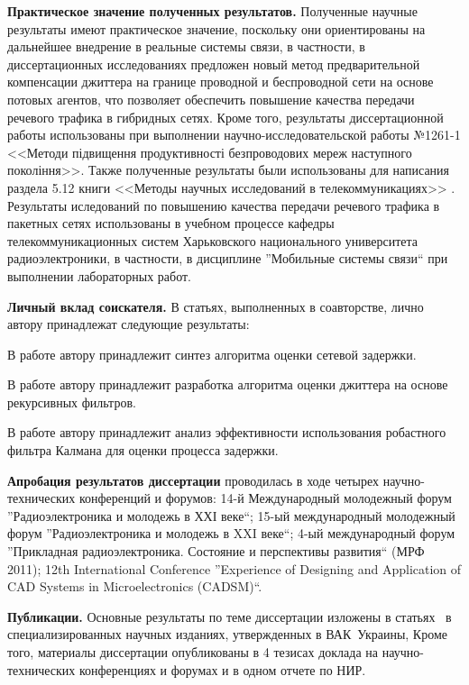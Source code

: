 \textbf{Практическое значение полученных результатов.} Полученные научные результаты имеют практическое значение, 
поскольку они ориентированы на дальнейшее внедрение в реальные системы связи, 
в частности, в диссертационных исследованиях предложен новый метод предварительной компенсации джиттера на границе проводной и беспроводной сети на основе потовых агентов,
что позволяет обеспечить повышение качества передачи речевого трафика в гибридных сетях.
Кроме того, результаты диссертационной работы использованы при выполнении научно-исследовательской работы №1261-1 <<Методи підвищення продуктивності безпроводових мереж наступного покоління>>.
Также полученные результаты были использованы для написания раздела 5.12 книги <<Методы научных исследований в телекоммуникациях>> \cite{popovski_method}.
Результаты иследований по повышению качества передачи речевого трафика в пакетных сетях использованы в учебном процессе кафедры телекоммуникационных систем Харьковского национального университета радиоэлектроники,
в частности, в дисциплине ''Мобильные системы связи`` при выполнении лабораторных работ.



\textbf{Личный вклад соискателя.} В статьях, выполненных в соавторстве, лично автору принадлежат следующие результаты: 

В работе \cite{my1} автору принадлежит синтез алгоритма оценки сетевой задержки.

В работе \cite{my2} автору принадлежит разработка алгоритма оценки джиттера на основе рекурсивных фильтров.

В работе \cite{my4} автору принадлежит анализ эффективности использования робастного фильтра Калмана для оценки процесса задержки.

\textbf{Апробация результатов диссертации} проводилась в ходе четырех научно-технических конференций и форумов:
14-й Международный молодежный форум ''Радиоэлектроника и молодежь в ХХІ веке``;
15-ый международный молодежный форум ''Радиоэлектроника и молодежь в XXI веке``;
4-ый международный форум ''Прикладная радиоэлектроника. Состояние и перспективы развития`` (МРФ 2011);
12th International Conference ''Experience of Designing and Application of CAD Systems in Microelectronics (CADSM)``.



\textbf{Публикации.} Основные результаты по теме диссертации изложены в статьях~\cite{my1,my2,my3,my4,my5} в специализированных научных изданиях, утвержденных в ВАК~Украины, Кроме того, материалы диссертации опубликованы в 4 тезисах доклада на научно-технических конференциях и форумах \cite{my6,my7,my8,my9} и в одном отчете по НИР.


\clearpage